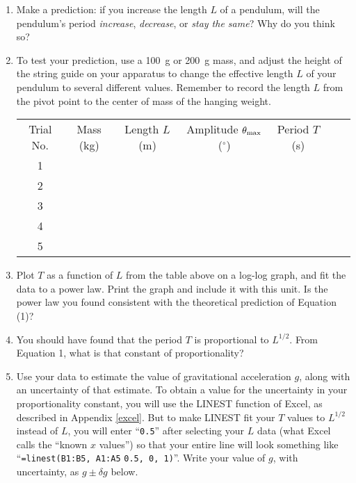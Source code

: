 \begin{enumerate}[labparts]

\item Make a prediction: if you increase the length $L$ of a pendulum, will the pendulum's period \textit{increase}, \textit{decrease}, or \textit{stay the same}?  Why do you think so?
\answerspace{0.8in}

\item To test your prediction, use a 100~g or 200~g mass, and adjust the height of the string guide on your apparatus to change the effective length $L$ of your pendulum to several different values.  Remember to record the length $L$ from the pivot point to the center of mass of the hanging weight.  


\begin{center}
{\renewcommand{\arraystretch}{1.8}
\begin{tabular}{|c|c|c|c|c|c|c|} \hline
Trial No. & Mass (kg) & Length $L$ (m) & Amplitude $\theta_{\rm max}$ ($^\circ$) & Period $T$ (s) \\ 
\hhline{|=|=|=|=|=|}
1 & & & & \\ \hline 
2 & & & & \\ \hline 
3 & & & & \\ \hline 
4 & & & & \\ \hline 
5 & & & & \\ \hline
\end{tabular} }
\end{center}

\item Plot $T$ as a function of $L$ from the table above on a log-log graph, and fit the data to a power law.  Print the graph and include it with this unit.  Is the power law you found consistent with the theoretical prediction of Equation (1)?
\answerspace{0.6in}

\item You should have found that the period $T$ is proportional to $L^{1/2}$.  From Equation 1, what is that constant of proportionality?
\answerspace{0.4in}

\pagebreak[2]
\item Use your data to estimate the value of gravitational acceleration $g$, along with an uncertainty of that estimate.  To obtain a value for the uncertainty in your proportionality constant, you will use the LINEST function of Excel, as described in Appendix \ref{excel}.
But to make LINEST fit your $T$ values to $L^{1/2}$ instead of $L$, you will enter ``\specialcaret \verb!0.5!'' after selecting your $L$ data (what Excel calls the ``known $x$ values'') so that your entire line will look something like ``\verb!=linest(B1:B5, A1:A5! \specialcaret \verb!0.5, 0, 1)!''.  Write your value of $g$, with uncertainty, as $g \pm \delta g$ below.
\answerspace{1.4in}
\end{enumerate}

